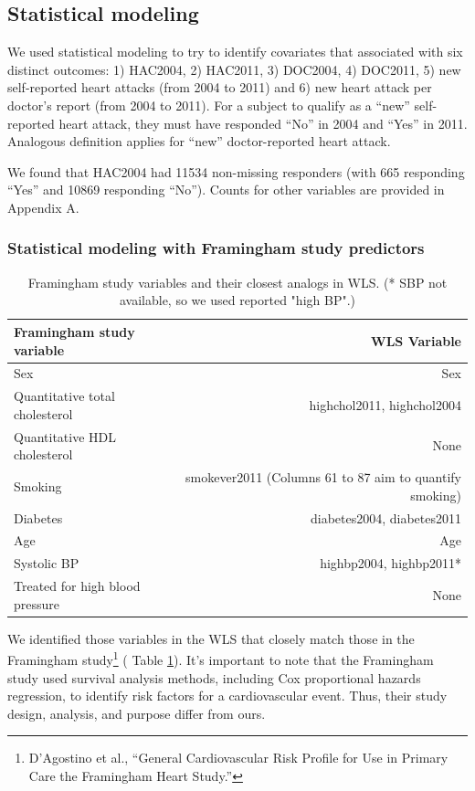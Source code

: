 \documentclass[11pt,]{article}
\let\rmarkdownfootnote\footnote%
\def\footnote{\protect\rmarkdownfootnote}
\begin{document}
\subsection{Statistical modeling}\label{statistical-modeling}

We used statistical modeling to try to identify covariates that
associated with six distinct outcomes: 1) HAC2004, 2) HAC2011, 3)
DOC2004, 4) DOC2011, 5) new self-reported heart attacks (from 2004 to
2011) and 6) new heart attack per doctor's report (from 2004 to 2011).
For a subject to qualify as a ``new'' self-reported heart attack, they
must have responded ``No'' in 2004 and ``Yes'' in 2011. Analogous
definition applies for ``new'' doctor-reported heart attack.

We found that HAC2004 had 11534 non-missing responders (with 665
responding ``Yes'' and 10869 responding ``No''). Counts for other
variables are provided in Appendix A.

\subsubsection{Statistical modeling with Framingham study
predictors}\label{statistical-modeling-with-framingham-study-predictors}

\begin{table}
\begin{tabular}{l r}\label{tab:fram2wls}
Framingham study variable & WLS Variable\\
\hline
Sex & Sex\\
Quantitative total cholesterol & highchol2011, highchol2004\\
Quantitative HDL cholesterol & None\\
Smoking & smokever2011 (Columns 61 to 87 aim to quantify smoking) \\
Diabetes & diabetes2004, diabetes2011\\
Age & Age\\
Systolic BP & highbp2004, highbp2011* \\
Treated for high blood pressure & None\\
\hline
\end{tabular}
\caption{Framingham study variables and their closest analogs in WLS. (* SBP not available, so we used reported "high BP".)}
\end{table}

We identified those variables in the WLS that closely match those in the
Framingham study\footnote{D'Agostino et al., ``General Cardiovascular
  Risk Profile for Use in Primary Care the Framingham Heart Study.'' } (
Table \ref{tab:fram2wls}). It's important to note that the Framingham
study used survival analysis methods, including Cox proportional hazards
regression, to identify risk factors for a cardiovascular event. Thus,
their study design, analysis, and purpose differ from ours.
\end{document}
